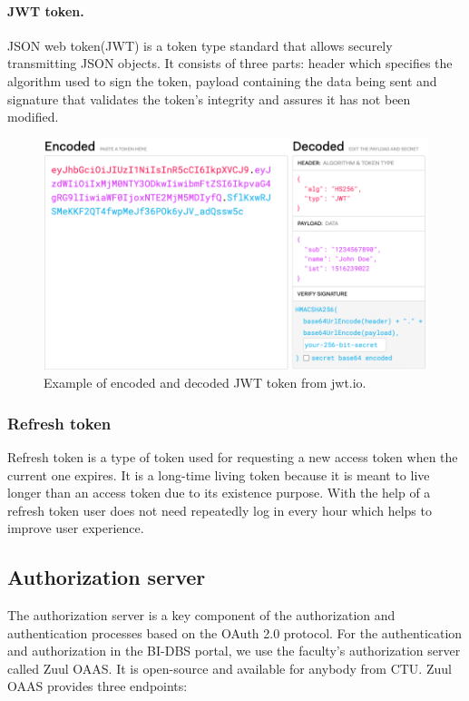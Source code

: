 \paragraph*{JWT token.} JSON web token(JWT) is a token type standard that allows securely transmitting JSON objects. It consists of three parts: header which specifies the algorithm used to sign the token, payload containing the data being sent and signature that validates the token's integrity and assures it has not been modified. \cite{jwt-token}

\begin{figure}[hp]
\centering
\includegraphics[scale=0.38]{../png/jwt_token.png}
\caption{Example of encoded and decoded JWT token from jwt.io. \cite{jwt-token}}
\end{figure}



\subsubsection{Refresh token} Refresh token is a type of token used for requesting a new access token when the current one expires. It is a long-time living token because it is meant to live longer than an access token due to its existence purpose. With the help of a refresh token user does not need repeatedly log in every hour which helps to improve user experience. \cite{refresh-token}


\subsection{Authorization server} The authorization server is a key component of the authorization and authentication processes based on the OAuth 2.0 protocol. 
For the authentication and authorization in the BI-DBS portal, we use the faculty's authorization server called Zuul OAAS. It is open-source and available for anybody from CTU. \cite{auth-server} Zuul OAAS provides three endpoints:

